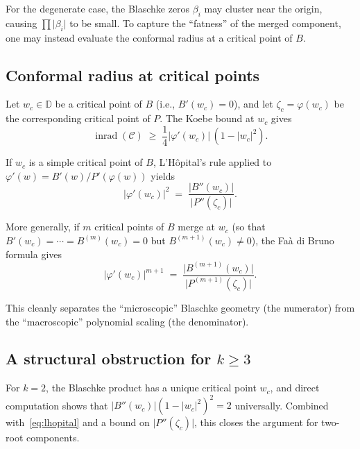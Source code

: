 \documentclass[11pt,a4paper]{amsart}
\theoremstyle{definition}
\newcommand{\D}{\mathbb{D}}
\newcommand{\abs}[1]{\lvert #1 \rvert}
\newcommand{\inrad}{\operatorname{inrad}}
\begin{document}
For the degenerate case, the Blaschke zeros $\beta_i$ may cluster
near the origin, causing $\prod\abs{\beta_i}$ to be small.
To capture the ``fatness'' of the merged component, one may instead
evaluate the conformal radius at a critical point of $B$.

\subsection{Conformal radius at critical points}

Let $w_c \in \D$ be a critical point of $B$ (i.e., $B'(w_c) = 0$),
and let $\zeta_c = \varphi(w_c)$ be the corresponding critical point
of $P$.  The Koebe bound at $w_c$ gives
\begin{equation}\label{eq:crit-koebe}
  \inrad(\mathcal{C}) \;\geq\;
  \frac{1}{4}\abs{\varphi'(w_c)}\,(1 - \abs{w_c}^2).
\end{equation}

If $w_c$ is a simple critical point of $B$, L'H\^{o}pital's rule applied
to $\varphi'(w) = B'(w)/P'(\varphi(w))$ yields
\begin{equation}\label{eq:lhopital}
  \abs{\varphi'(w_c)}^2 \;=\;
  \frac{\abs{B''(w_c)}}{\abs{P''(\zeta_c)}}.
\end{equation}

More generally, if $m$ critical points of $B$ merge at $w_c$
(so that $B'(w_c) = \cdots = B^{(m)}(w_c) = 0$ but
$B^{(m+1)}(w_c) \neq 0$), the Fa\`{a} di Bruno formula gives
\begin{equation}\label{eq:faa-di-bruno}
  \abs{\varphi'(w_c)}^{m+1} \;=\;
  \frac{\abs{B^{(m+1)}(w_c)}}{\abs{P^{(m+1)}(\zeta_c)}}.
\end{equation}

This cleanly separates the ``microscopic'' Blaschke geometry (the
numerator) from the ``macroscopic'' polynomial scaling (the denominator).

\subsection{A structural obstruction for $k \geq 3$}
\label{sec:obstruction}

For $k = 2$, the Blaschke product has a unique critical point $w_c$,
and direct computation shows that $\abs{B''(w_c)}(1-\abs{w_c}^2)^2 = 2$
universally.  Combined with~\eqref{eq:lhopital} and a bound on
$\abs{P''(\zeta_c)}$, this closes the argument for two-root components.
\end{document}
